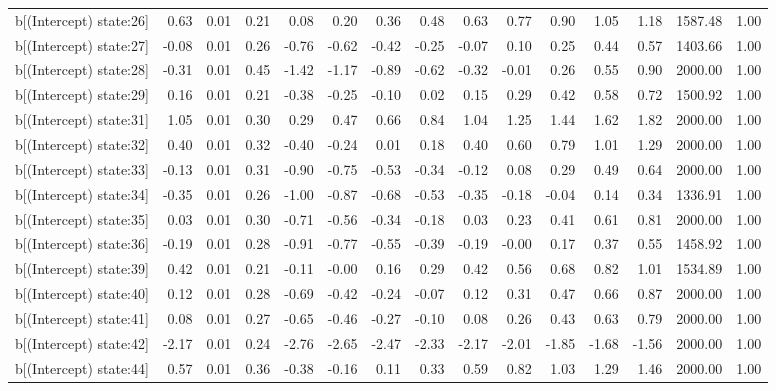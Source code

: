 \begin{table}[ht]
\begin{tabular}{rrrrrrrrrrrrrrr}
  b[(Intercept) state:26] & 0.63 & 0.01 & 0.21 & 0.08 & 0.20 & 0.36 & 0.48 & 0.63 & 0.77 & 0.90 & 1.05 & 1.18 & 1587.48 & 1.00 \\ 
  b[(Intercept) state:27] & -0.08 & 0.01 & 0.26 & -0.76 & -0.62 & -0.42 & -0.25 & -0.07 & 0.10 & 0.25 & 0.44 & 0.57 & 1403.66 & 1.00 \\ 
  b[(Intercept) state:28] & -0.31 & 0.01 & 0.45 & -1.42 & -1.17 & -0.89 & -0.62 & -0.32 & -0.01 & 0.26 & 0.55 & 0.90 & 2000.00 & 1.00 \\ 
  b[(Intercept) state:29] & 0.16 & 0.01 & 0.21 & -0.38 & -0.25 & -0.10 & 0.02 & 0.15 & 0.29 & 0.42 & 0.58 & 0.72 & 1500.92 & 1.00 \\ 
  b[(Intercept) state:31] & 1.05 & 0.01 & 0.30 & 0.29 & 0.47 & 0.66 & 0.84 & 1.04 & 1.25 & 1.44 & 1.62 & 1.82 & 2000.00 & 1.00 \\ 
  b[(Intercept) state:32] & 0.40 & 0.01 & 0.32 & -0.40 & -0.24 & 0.01 & 0.18 & 0.40 & 0.60 & 0.79 & 1.01 & 1.29 & 2000.00 & 1.00 \\ 
  b[(Intercept) state:33] & -0.13 & 0.01 & 0.31 & -0.90 & -0.75 & -0.53 & -0.34 & -0.12 & 0.08 & 0.29 & 0.49 & 0.64 & 2000.00 & 1.00 \\ 
  b[(Intercept) state:34] & -0.35 & 0.01 & 0.26 & -1.00 & -0.87 & -0.68 & -0.53 & -0.35 & -0.18 & -0.04 & 0.14 & 0.34 & 1336.91 & 1.00 \\ 
  b[(Intercept) state:35] & 0.03 & 0.01 & 0.30 & -0.71 & -0.56 & -0.34 & -0.18 & 0.03 & 0.23 & 0.41 & 0.61 & 0.81 & 2000.00 & 1.00 \\ 
  b[(Intercept) state:36] & -0.19 & 0.01 & 0.28 & -0.91 & -0.77 & -0.55 & -0.39 & -0.19 & -0.00 & 0.17 & 0.37 & 0.55 & 1458.92 & 1.00 \\ 
  b[(Intercept) state:39] & 0.42 & 0.01 & 0.21 & -0.11 & -0.00 & 0.16 & 0.29 & 0.42 & 0.56 & 0.68 & 0.82 & 1.01 & 1534.89 & 1.00 \\ 
  b[(Intercept) state:40] & 0.12 & 0.01 & 0.28 & -0.69 & -0.42 & -0.24 & -0.07 & 0.12 & 0.31 & 0.47 & 0.66 & 0.87 & 2000.00 & 1.00 \\ 
  b[(Intercept) state:41] & 0.08 & 0.01 & 0.27 & -0.65 & -0.46 & -0.27 & -0.10 & 0.08 & 0.26 & 0.43 & 0.63 & 0.79 & 2000.00 & 1.00 \\ 
  b[(Intercept) state:42] & -2.17 & 0.01 & 0.24 & -2.76 & -2.65 & -2.47 & -2.33 & -2.17 & -2.01 & -1.85 & -1.68 & -1.56 & 2000.00 & 1.00 \\ 
  b[(Intercept) state:44] & 0.57 & 0.01 & 0.36 & -0.38 & -0.16 & 0.11 & 0.33 & 0.59 & 0.82 & 1.03 & 1.29 & 1.46 & 2000.00 & 1.00 \\ 

\end{tabular}
\end{table}
